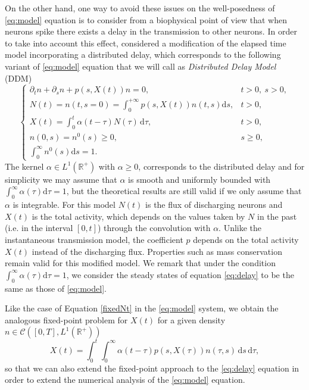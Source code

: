 \documentclass[11pt,a4paper]{article}
\newcommand{\R}{\mathbb{R}}
\newcommand{\dd}{\mathrm{d}}
\begin{document}
On the other hand, one way to avoid these issues on the well-posedness of \eqref{eq:model} equation is to consider from a biophysical point of view that when neurons spike there exists a delay in the transmission to other neurons. In order to take into account this effect, %
\cite{pakdaman2009dynamics} considered a modification of the elapsed time model incorporating a distributed delay, which corresponds to the following variant of \eqref{eq:model} equation that we will call as \textit{Distributed Delay Model} (DDM)
\begin{equation}\label{eq:delay}
\tag{DDM}
\begin{cases}
    \partial_tn+\partial_s n+p(s,X(t))n = 0,  & t>0,\: s>0, \\
    N(t)=n(t,s=0)= \int_0^{+\infty}p(s,X(t))n(t,s) \dd s,& t>0,\\
    X(t)=\int_0^t \alpha(t-\tau)N(\tau)\,\dd \tau, & t>0,\\
    n(0,s)=n^0(s)\geq0,& s\geq 0,\\
    \int_0^{\infty}n^0(s)\dd s=1. &
\end{cases}
\end{equation}
The kernel $\alpha\in L^1(\R^+)$ with $\alpha\ge0$, corresponds to the distributed delay and for simplicity we may assume that $\alpha$ is smooth and uniformly bounded with $\int_0^\infty\alpha(\tau)\dd \tau=1$, but the theoretical results are still valid if we only assume that $\alpha$ is integrable. For this model $N(t)$ is the flux of discharging neurons and $X(t)$ is the total activity, which depends on the values taken by $N$ in the past (i.e. in the interval $[0,t]$) through the convolution with $\alpha$. Unlike the instantaneous transmission model, the coefficient $p$ depends on the total activity $X(t)$ instead of the discharging flux. Properties such as mass conservation remain valid for this modified model. We remark that under the condition $\int_0^\infty\alpha(\tau)\dd \tau=1$, we consider the steady states of equation \eqref{eq:delay} to be the same as those of \eqref{eq:model}.

Like the case of Equation \eqref{fixedNt} in the \eqref{eq:model} system, we obtain the analogous fixed-point problem for $X(t)$ for a given density $n\in\mathcal{C}([0,T],L^1(\R^+))$
\begin{equation}
 X(t)=\int_0^t\int_0^\infty\alpha(t-\tau)p(s,X(\tau))n(\tau,s)\,\dd s\,\dd \tau,    
\end{equation}
so that we can also extend the fixed-point approach to the \eqref{eq:delay} equation in order to extend the numerical analysis of the \eqref{eq:model} equation.
\end{document}
